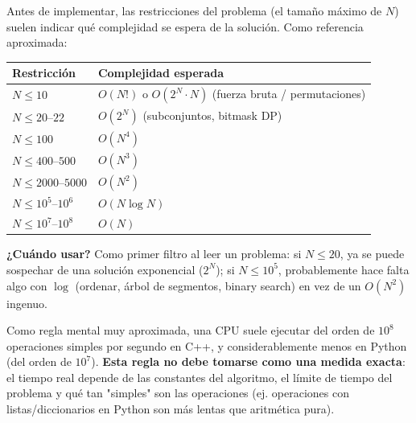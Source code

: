 Antes de implementar, las restricciones del problema (el tamaño máximo de \(N\)) suelen indicar qué complejidad se espera de la solución. Como referencia aproximada:

\begin{center}
\small
\begin{tabular}{|p{2.2cm}|p{3.3cm}|}
\hline
\textbf{Restricción} & \textbf{Complejidad esperada} \\
\hline
\(N \leq 10\) & \(O(N!)\) o \(O(2^N \cdot N)\) (fuerza bruta / permutaciones) \\
\hline
\(N \leq 20\)--\(22\) & \(O(2^N)\) (subconjuntos, bitmask DP) \\
\hline
\(N \leq 100\) & \(O(N^4)\) \\
\hline
\(N \leq 400\)--\(500\) & \(O(N^3)\) \\
\hline
\(N \leq 2000\)--\(5000\) & \(O(N^2)\) \\
\hline
\(N \leq 10^5\)--\(10^6\) & \(O(N \log N)\) \\
\hline
\(N \leq 10^7\)--\(10^8\) & \(O(N)\) \\
\hline
\end{tabular}
\end{center}

\textbf{¿Cuándo usar?} Como primer filtro al leer un problema: si \(N \leq 20\), ya se puede sospechar de una solución exponencial ($2^N$); si \(N \leq 10^5\), probablemente hace falta algo con \(\log\) (ordenar, árbol de segmentos, binary search) en vez de un \(O(N^2)\) ingenuo.

Como regla mental muy aproximada, una CPU suele ejecutar del orden de \(10^8\) operaciones simples por segundo en C++, y considerablemente menos en Python (del orden de \(10^7\)). \textbf{Esta regla no debe tomarse como una medida exacta}: el tiempo real depende de las constantes del algoritmo, el límite de tiempo del problema y qué tan "simples" son las operaciones (ej. operaciones con listas/diccionarios en Python son más lentas que aritmética pura).
